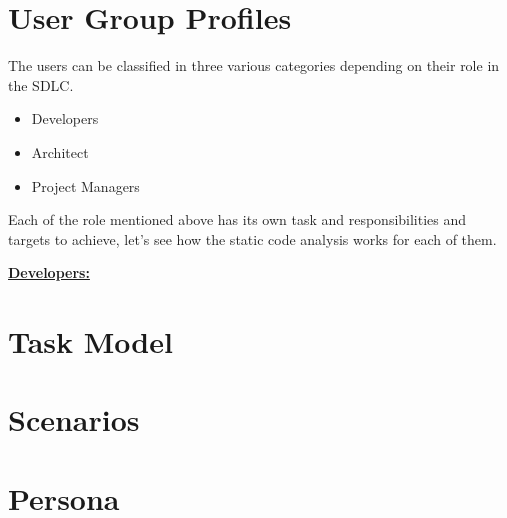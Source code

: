 	
\section{User Group Profiles}
The users can be classified in three various categories depending on their role in the SDLC.
\begin{itemize}
\item Developers
\item Architect
\item Project Managers
\end{itemize}

Each of the role mentioned above has its own task and responsibilities and targets to achieve, let's see how the static code analysis works for each of them. 
\vspace{1mm}

\textbf{\underline{Developers:}}  
\section{Task Model}
\section{Scenarios}
\section{Persona}